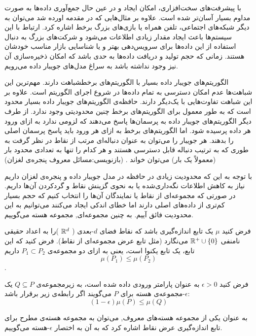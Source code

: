 با پیشرفت‌های سخت‌افزاری، امکان ایجاد و در عین حال جمع‌آوری داده‌ها به صورت مداوم بسیار آسان‌تر شده است. علاوه بر مثال‌هایی که در مقدمه اورده شد می‌توان به دیگر شبکه‌های اجتماعی، تلفن همراه یا بازی‌های بزرگ برخط اشاره کرد. ارتباط با این سیستم‌ها باعث ایجاد مقدار زیادی اطلاعات می‌شود و شرکت‌های بزرگ به دنبال استفاده از این داده‌ها برای سرویس‌دهی بهتر و یا شناسایی بازار مناسب خودشان هستند. زمانی که حجم تولید و دریافت داده‌ها به حدی باشد که امکان ذخیره‌سازی آن نیز وجود نداشته باشد به سراغ مدل‌های جویبار داده می‌رویم.

الگوریتم‌های جویبار داده بسیار با الگوریتم‌های برخطشباهت دارند. مهم‌ترین این شباهت‌ها عدم امکان دسترسی به تمام داده‌ها در شروع اجرای الگوریتم است. علاوه بر این شباهت تفاوت‌هایی با یک‌دیگر دارند. حافظه‌ی الگوریتم‌های جویبار داده بسیار محدود است که به طور معمول برای الگوریتم‌های برخط چنین محدودیتی وجود ندارد. از طرف دیگر الگوریتم‌های جویبار داده به پرسمان‌ها پاسخ می‌دهند که لزومی ندارد به ازای ورود هر داده پرسیده شود. اما الگوریتم‌های برخط به ازای هر ورود باید پاسخ پرسمان اصلی را بدهند.
هر جویبار را می‌توان به عنوان دنباله‌ای مرتب از نقاط در نظر گرفت به طوری که به ترتیب دنباله قابل دسترسی هستند و هر کدام را تنها به تعدادی محدود بار (معمولاً یک بار) می‌توان خواند .
(بازنویسی:مسائل معروف پنجره‌ی لغزان)

با توجه به این که محدودیت زیادی در حافظه در مدل جویبار داده و پنجره‌ی لغزان داریم نیاز به کاهش اطلاعات نگه‌داری‌شده یا به نحوی گزینش نقاط و گردکردن آن‌ها داریم.
در صورتی که مجموعه‌ای از نقاط یا نمایندگان آن‌ها را انتخاب کنیم که حجم بسیار کم‌تری از داده‌های اصلی دارند اما خطای اندکی ایجاد می‌کنند می‌توانیم به این محدودیت فائق آییم. به چنین مجموعه‌ای, مجموعه هسته می‌گوییم.


فرض کنید $\mu$ یک تابع اندازه‌گیری باشد که نقاط فضای $d$-بعدی ‌( $\mathbb{R}^d$ )را به اعداد حقیقی نامنفی $\mathbb{R}^+ \cup \left\{ 0 \right\}$ می‌نگارد (مثل تابع عرض مجموعه‌ای از نقاط). 
فرض کنید که این تابع، یک تابع یکنوا است، یعنی به ازای دو مجموعه‌ی  $P_1 \subset P_2$ داریم
$$\mu(P_1) \leq \mu(P_2)$$.

فرض کنید $\epsilon > 0$ به عنوان پارامتر ورودی داده شده است، به زیرمجموعه‌ی $Q \subseteq P$ یک $\epsilon$-مجموعه‌ی هسته برای $P$ می‌گویند اگر رابطه‌ی زیر برقرار باشد:
$$(1 - \epsilon) \mu(P) \leq \mu (Q)$$


به عنوان یکی از مجموعه هسته‌های معروف, می‌توان به مجموعه هسته‌ی مطرح برای تابع اندازه‌گیری عرض نقاط اشاره کرد که به آن به اختصار $\epsilon$-هسته می‌گوییم.

